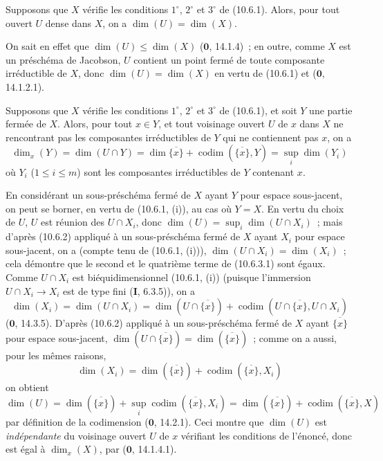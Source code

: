\begin{corollary}[10.6.2]
\label{IV.10.6.2-fr}
Supposons que $X$ vérifie les conditions $1^\circ$, $2^\circ$ et $3^\circ$ de
\textup{(10.6.1)}. Alors, pour tout ouvert $U$ dense dans $X$, on a
$\dim(U)=\dim(X)$.
\end{corollary}

On sait en effet que $\dim(U)\leq\dim(X)$ ($\mathbf 0$, 14.1.4)~; en outre,
comme $X$ est un préschéma de Jacobson, $U$ contient un point fermé de toute
composante irréductible de $X$, donc $\dim(U)=\dim(X)$ en vertu de (10.6.1) et
($\mathbf 0$, 14.1.2.1).

\begin{proposition}[10.6.3]
\label{IV.10.6.3-fr}
Supposons que $X$ vérifie les conditions $1^\circ$, $2^\circ$ et $3^\circ$ de
\textup{(10.6.1)}, et soit $Y$ une partie fermée de $X$. Alors, pour tout $x\in Y$, et
tout voisinage ouvert $U$ de $x$ dans $X$ ne rencontrant pas les composantes
irréductibles de $Y$ qui ne contiennent pas $x$, on a
\begin{equation}
\label{IV.10.6.3.1-fr}
\tag{10.6.3.1}
\dim_x(Y)=\dim(U\cap Y)=\dim\overline{\{x\}}
 +\operatorname{codim}(\overline{\{x\}},Y)=\sup_i\dim(Y_i)
\end{equation}
où $Y_i$ \textup{(}$1\leq i\leq m$\textup{)} sont les composantes irréductibles de $Y$ contenant
$x$.
\end{proposition}

En considérant un sous-préschéma fermé de $X$ ayant $Y$ pour espace sous-jacent,
on peut se borner, en vertu de (10.6.1, (i)), au cas où $Y=X$. En vertu du choix
de $U$, $U$ est réunion des $U\cap X_i$, donc
$\dim(U)=\sup_i\dim(U\cap X_i)$~; mais d'après (10.6.2) appliqué à un
sous-préschéma fermé de $X$ ayant $X_i$ pour espace sous-jacent, on a (compte
tenu de (10.6.1, (i))), $\dim(U\cap X_i)=\dim(X_i)$~; cela démontre que le second
et le quatrième terme de (10.6.3.1) sont égaux. Comme $U\cap X_i$ est
biéquidimensionnel (10.6.1, (i)) (puisque l'immersion $U\cap X_i\to X_i$ est de
type fini (\textbf{I}, 6.3.5)), on a
\begin{equation}
\label{IV.10.6.3.2-fr}
\tag{10.6.3.2}
\dim(X_i)=\dim(U\cap X_i)=\dim(U\cap\overline{\{x\}})
 +\operatorname{codim}(U\cap\overline{\{x\}},U\cap X_i)
\end{equation}
($\mathbf 0$, 14.3.5). D'après (10.6.2) appliqué à un sous-préschéma fermé de
$X$ ayant $\overline{\{x\}}$ pour espace sous-jacent,
$\dim(U\cap\overline{\{x\}})=\dim(\overline{\{x\}})$~; comme on a aussi, pour les
mêmes raisons,
\begin{equation}
\label{IV.10.6.3.3-fr}
\tag{10.6.3.3}
\dim(X_i)=\dim(\overline{\{x\}})
 +\operatorname{codim}(\overline{\{x\}},X_i)
\end{equation}
on obtient
\[
  \dim(U)=\dim(\overline{\{x\}})
  +\sup_i\operatorname{codim}(\overline{\{x\}},X_i)
  =\dim(\overline{\{x\}})+\operatorname{codim}(\overline{\{x\}},X)
\]
par définition de la codimension ($\mathbf 0$, 14.2.1). Ceci montre que $\dim(U)$
est \emph{indépendante} du voisinage ouvert $U$ de $x$ vérifiant les conditions de
l'énoncé, donc est égal à $\dim_x(X)$, par ($\mathbf 0$, 14.1.4.1).

